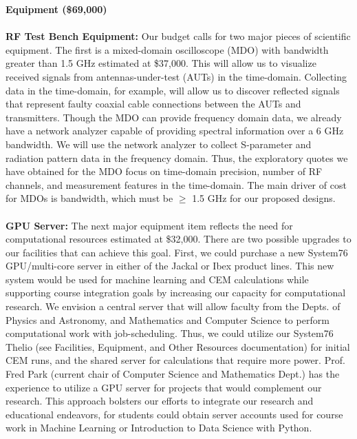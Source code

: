 \documentclass[11pt]{amsart}
\begin{document}
\noindent
\textbf{Equipment (\$69,000)} \\ \\
\noindent
\textbf{RF Test Bench Equipment:} Our budget calls for two major pieces of scientific equipment. The first is a mixed-domain oscilloscope (MDO) with bandwidth greater than 1.5 GHz estimated at \$37,000. This will allow us to visualize received signals from antennas-under-test (AUTs) in the time-domain. Collecting data in the time-domain, for example, will allow us to discover reflected signals that represent faulty coaxial cable connections between the AUTs and transmitters. Though the MDO can provide frequency domain data, we already have a network analyzer capable of providing spectral information over a 6 GHz bandwidth. We will use the network analyzer to collect S-parameter and radiation pattern data in the frequency domain. Thus, the exploratory quotes we have obtained for the MDO focus on time-domain precision, number of RF channels, and measurement features in the time-domain. The main driver of cost for MDOs is bandwidth, which must be $\geq$ 1.5 GHz for our proposed designs. \\ \\
\noindent
\textbf{GPU Server:} The next major equipment item reflects the need for computational resources estimated at \$32,000. There are two possible upgrades to our facilities that can achieve this goal. First, we could purchase a new System76 GPU/multi-core server in either of the Jackal or Ibex product lines. This new system would be used for machine learning and CEM calculations while supporting course integration goals by increasing our capacity for computational research. We envision a central server that will allow faculty from the Depts. of Physics and Astronomy, and Mathematics and Computer Science to perform computational work with job-scheduling. Thus, we could utilize our System76 Thelio (see Facilities, Equipment, and Other Resources documentation) for initial CEM runs, and the shared server for calculations that require more power. Prof. Fred Park (current chair of Computer Science and Mathematics Dept.) has the experience to utilize a GPU server for projects that would complement our research. This approach bolsters our efforts to integrate our research and educational endeavors, for students could obtain server accounts used for course work in Machine Learning or Introduction to Data Science with Python. \\
\end{document}
